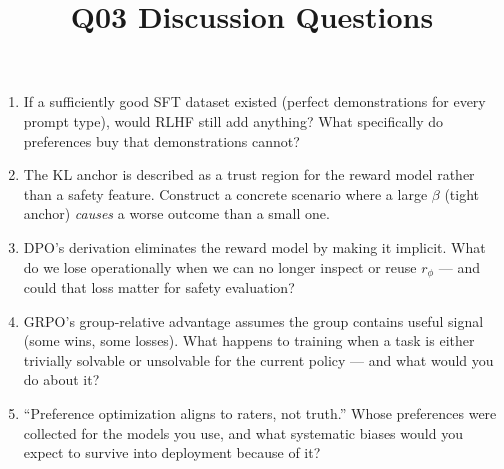 \documentclass[11pt]{article}
\title{Q03 Discussion Questions}
\date{}
\begin{document}
\maketitle
\begin{enumerate}[noitemsep]
\item If a sufficiently good SFT dataset existed (perfect demonstrations for every prompt type), would RLHF still add anything? What specifically do preferences buy that demonstrations cannot?
\item The KL anchor is described as a trust region for the reward model rather than a safety feature. Construct a concrete scenario where a large $\beta$ (tight anchor) \emph{causes} a worse outcome than a small one.
\item DPO's derivation eliminates the reward model by making it implicit. What do we lose operationally when we can no longer inspect or reuse $r_\phi$ --- and could that loss matter for safety evaluation?
\item GRPO's group-relative advantage assumes the group contains useful signal (some wins, some losses). What happens to training when a task is either trivially solvable or unsolvable for the current policy --- and what would you do about it?
\item ``Preference optimization aligns to raters, not truth.'' Whose preferences were collected for the models you use, and what systematic biases would you expect to survive into deployment because of it?
\end{enumerate}
\end{document}
